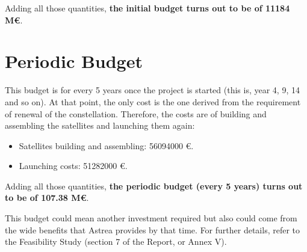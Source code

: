 Adding all those quantities, \textbf{the initial budget turns out to be of 11184 M\euro}. 

\newpage
\section{Periodic Budget}
This budget is for every 5 years once the project is started (this is, year 4, 9, 14 and so on). At that point, the only cost is the one derived from the requirement of renewal of the constellation. Therefore, the costs are of building and assembling the satellites and launching them again:

\begin{itemize}
\item Satellites building and assembling: 56094000 \euro .
\item Launching costs: 51282000 \euro .
\end{itemize}

Adding all those quantities, \textbf{the periodic budget (every 5 years) turns out to be of 107.38 M\euro}. 

This budget could mean another investment required but also could come from the wide benefits that Astrea provides by that time. For further details, refer to the Feasibility Study (section 7 of the Report, or Annex V).



